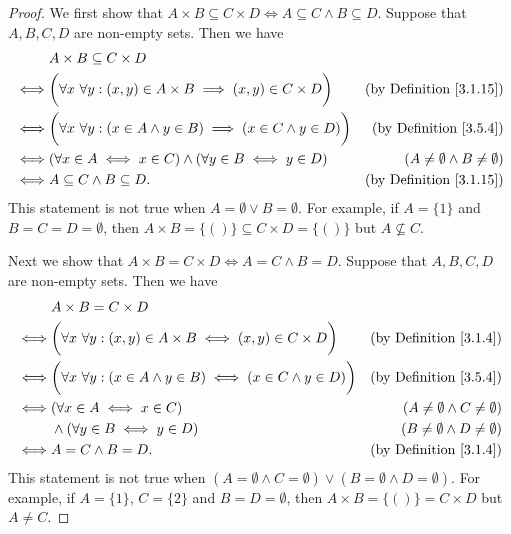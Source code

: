 \begin{proof}
    We first show that \(A \times B \subseteq C \times D \iff A \subseteq C \land B \subseteq D\).
    Suppose that \(A, B, C, D\) are non-empty sets.
    Then we have
    \begin{align*}
             & A \times B \subseteq C \times D                                                                                                         \\
        \iff & \bigg(\forall x \ \forall y : (x, y) \in A \times B \implies (x, y) \in C \times D\bigg)    & \text{(by Definition \ref{3.1.15})}       \\
        \iff & \bigg(\forall x \ \forall y :(x \in A \land y \in B) \implies (x \in C \land y \in D)\bigg) & \text{(by Definition \ref{3.5.4})}        \\
        \iff & (\forall x \in A \iff x \in C) \land (\forall y \in B \iff y \in D)                         & (A \neq \emptyset \land B \neq \emptyset) \\
        \iff & A \subseteq C \land B \subseteq D.                                                          & \text{(by Definition \ref{3.1.15})}
    \end{align*}
    This statement is not true when \(A = \emptyset \lor B = \emptyset\).
    For example, if \(A = \{1\}\) and \(B = C = D = \emptyset\), then \(A \times B = \{()\} \subseteq C \times D = \{()\}\) but \(A \not \subseteq C\).

    Next we show that \(A \times B = C \times D \iff A = C \land B = D\).
    Suppose that \(A, B, C, D\) are non-empty sets.
    Then we have
    \begin{align*}
             & A \times B = C \times D                                                                                                              \\
        \iff & \bigg(\forall x \ \forall y : (x, y) \in A \times B \iff (x, y) \in C \times D\bigg)     & \text{(by Definition \ref{3.1.4})}        \\
        \iff & \bigg(\forall x \ \forall y : (x \in A \land y \in B) \iff (x \in C \land y \in D)\bigg) & \text{(by Definition \ref{3.5.4})}        \\
        \iff & (\forall x \in A \iff x \in C)                                                           & (A \neq \emptyset \land C \neq \emptyset) \\
             & \land (\forall y \in B \iff y \in D)                                                     & (B \neq \emptyset \land D \neq \emptyset) \\
        \iff & A = C \land B = D.                                                                       & \text{(by Definition \ref{3.1.4})}
    \end{align*}
    This statement is not true when \((A = \emptyset \land C = \emptyset) \lor (B = \emptyset \land D = \emptyset)\).
    For example, if \(A = \{1\}\), \(C = \{2\}\) and \(B = D = \emptyset\), then \(A \times B = \{()\} = C \times D\) but \(A \neq C\).
\end{proof}

